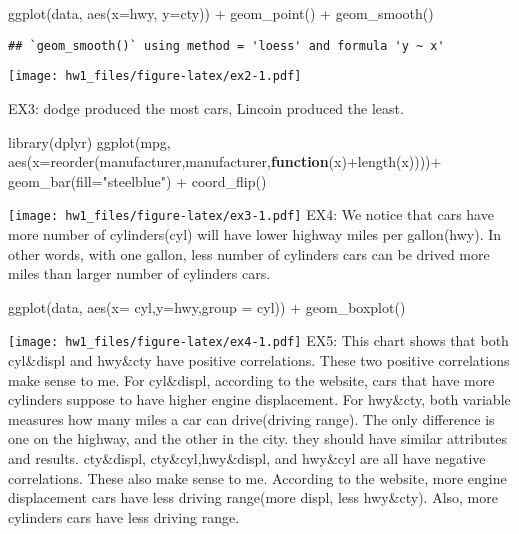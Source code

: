 \documentclass[
]{article}
\newenvironment{Shaded}{\begin{snugshade}}{\end{snugshade}}
\newcommand{\AttributeTok}[1]{\textcolor[rgb]{0.77,0.63,0.00}{#1}}
\newcommand{\ControlFlowTok}[1]{\textcolor[rgb]{0.13,0.29,0.53}{\textbf{#1}}}
\newcommand{\FunctionTok}[1]{\textcolor[rgb]{0.00,0.00,0.00}{#1}}
\newcommand{\NormalTok}[1]{#1}
\newcommand{\SpecialCharTok}[1]{\textcolor[rgb]{0.00,0.00,0.00}{#1}}
\newcommand{\StringTok}[1]{\textcolor[rgb]{0.31,0.60,0.02}{#1}}
\begin{document}
\begin{Shaded}
\begin{Highlighting}[]
\FunctionTok{ggplot}\NormalTok{(data, }\FunctionTok{aes}\NormalTok{(}\AttributeTok{x=}\NormalTok{hwy, }\AttributeTok{y=}\NormalTok{cty)) }\SpecialCharTok{+} \FunctionTok{geom\_point}\NormalTok{() }\SpecialCharTok{+} \FunctionTok{geom\_smooth}\NormalTok{()}
\end{Highlighting}
\end{Shaded}

\begin{verbatim}
## `geom_smooth()` using method = 'loess' and formula 'y ~ x'
\end{verbatim}

\texttt{[image: hw1\_files/figure-latex/ex2-1.pdf]}

EX3: dodge produced the most cars, Lincoin produced the least.

\begin{Shaded}
\begin{Highlighting}[]
\FunctionTok{library}\NormalTok{(dplyr)}
\FunctionTok{ggplot}\NormalTok{(mpg, }\FunctionTok{aes}\NormalTok{(}\AttributeTok{x=}\FunctionTok{reorder}\NormalTok{(manufacturer,manufacturer,}\ControlFlowTok{function}\NormalTok{(x)}\SpecialCharTok{+}\FunctionTok{length}\NormalTok{(x))))}\SpecialCharTok{+}
  \FunctionTok{geom\_bar}\NormalTok{(}\AttributeTok{fill=}\StringTok{"steelblue"}\NormalTok{) }\SpecialCharTok{+} \FunctionTok{coord\_flip}\NormalTok{()}
\end{Highlighting}
\end{Shaded}

\texttt{[image: hw1\_files/figure-latex/ex3-1.pdf]} EX4: We notice that
cars have more number of cylinders(cyl) will have lower highway miles
per gallon(hwy). In other words, with one gallon, less number of
cylinders cars can be drived more miles than larger number of cylinders
cars.

\begin{Shaded}
\begin{Highlighting}[]
\FunctionTok{ggplot}\NormalTok{(data, }\FunctionTok{aes}\NormalTok{(}\AttributeTok{x=}\NormalTok{ cyl,}\AttributeTok{y=}\NormalTok{hwy,}\AttributeTok{group =}\NormalTok{ cyl)) }\SpecialCharTok{+} 
  \FunctionTok{geom\_boxplot}\NormalTok{()}
\end{Highlighting}
\end{Shaded}

\texttt{[image: hw1\_files/figure-latex/ex4-1.pdf]} EX5: This chart shows
that both cyl\&displ and hwy\&cty have positive correlations. These two
positive correlations make sense to me. For cyl\&displ, according to the
website, cars that have more cylinders suppose to have higher engine
displacement. For hwy\&cty, both variable measures how many miles a car
can drive(driving range). The only difference is one on the highway, and
the other in the city. they should have similar attributes and results.
cty\&displ, cty\&cyl,hwy\&displ, and hwy\&cyl are all have negative
correlations. These also make sense to me. According to the website,
more engine displacement cars have less driving range(more displ, less
hwy\&cty). Also, more cylinders cars have less driving range.
\end{document}

